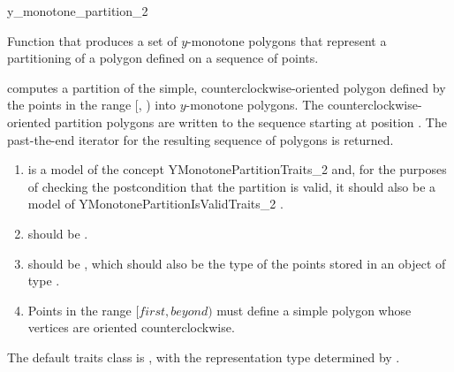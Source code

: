 \begin{ccRefFunction}{y_monotone_partition_2}

\ccDefinition

Function that produces a set of $y$-monotone polygons that 
represent a partitioning of a polygon defined on a sequence of points.


{
computes a partition of the simple, counterclockwise-oriented polygon defined 
by the points in the range [, ) into $y$-monotone 
polygons. The counterclockwise-oriented partition polygons are written to
the sequence starting at position .  The past-the-end iterator for 
the resulting sequence of polygons is returned.
}

\begin{enumerate}
    \item {} is a model of the concept YMonotonePartitionTraits\_2%
           and, for the purposes
          of checking the postcondition that the partition is valid, it should 
          also be a model of YMonotonePartitionIsValidTraits\_2%
          .
    \item {} should be 
          .
    \item {} should be ,
          which should also be the type of the points stored in an object
          of type .
    \item Points in the range $[first, beyond)$ must define a simple polygon
          whose vertices are oriented counterclockwise.
\end{enumerate}

The default traits class  is ,
with the representation type determined by .


\end{ccRefFunction}
